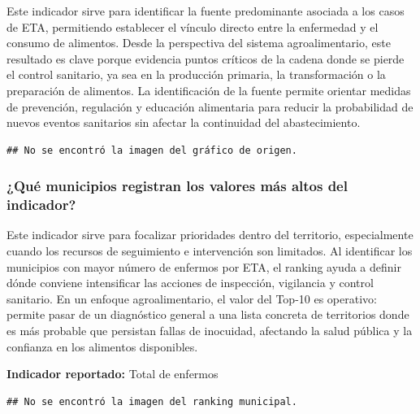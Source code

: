 \documentclass[
]{article}
\begin{document}
Este indicador sirve para identificar la fuente predominante asociada a
los casos de ETA, permitiendo establecer el vínculo directo entre la
enfermedad y el consumo de alimentos. Desde la perspectiva del sistema
agroalimentario, este resultado es clave porque evidencia puntos
críticos de la cadena donde se pierde el control sanitario, ya sea en la
producción primaria, la transformación o la preparación de alimentos. La
identificación de la fuente permite orientar medidas de prevención,
regulación y educación alimentaria para reducir la probabilidad de
nuevos eventos sanitarios sin afectar la continuidad del abastecimiento.

\begin{verbatim}
## No se encontró la imagen del gráfico de origen.
\end{verbatim}

\subsubsection{¿Qué municipios registran los valores más altos del
indicador?}\label{quuxe9-municipios-registran-los-valores-muxe1s-altos-del-indicador}

Este indicador sirve para focalizar prioridades dentro del territorio,
especialmente cuando los recursos de seguimiento e intervención son
limitados. Al identificar los municipios con mayor número de enfermos
por ETA, el ranking ayuda a definir dónde conviene intensificar las
acciones de inspección, vigilancia y control sanitario. En un enfoque
agroalimentario, el valor del Top-10 es operativo: permite pasar de un
diagnóstico general a una lista concreta de territorios donde es más
probable que persistan fallas de inocuidad, afectando la salud pública y
la confianza en los alimentos disponibles.

\textbf{Indicador reportado:} Total de enfermos

\begin{verbatim}
## No se encontró la imagen del ranking municipal.
\end{verbatim}
\end{document}
